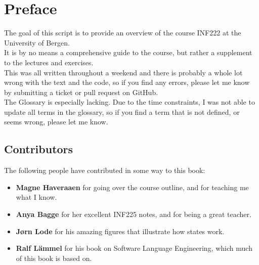 \section*{Preface}
    The goal of this script is to provide an overview of the course INF222 at the University of Bergen.\\
    It is by no means a comprehensive guide to the course, but rather a supplement to the lectures and exercises.\\
    This was all written throughout a weekend and there is probably a whole lot wrong with the text and the code, so if you find any errors, please let me know by submitting a ticket or pull request on GitHub.\\
    The Glossary is especially lacking. Due to the time constraints, I was not able to update all terms in the glossary, so if you find a term that is not defined, or seems wrong, please let me know.\\
    
    
    \subsection*{Contributors}
    The following people have contributed in some way to this book:
    \begin{itemize}
        \item \textbf{Magne Haveraaen} for going over the course outline, and for teaching me what I know.
        \item \textbf{Anya Bagge} for her excellent INF225 notes, and for being a great teacher.
        \item \textbf{Jørn Lode} for his amazing figures that illustrate how states work.
        \item \textbf{Ralf Lämmel} for his book on Software Language Engineering, which much of this book is based on.
    \end{itemize}

